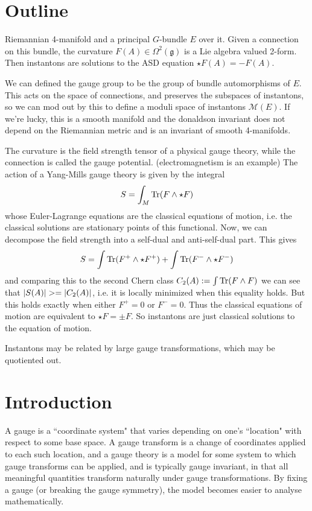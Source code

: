 \section{Outline}
Riemannian 4-manifold and a principal $G$-bundle $E$ over it. Given a connection
on this bundle, the curvature  $F(A)\in \Omega^2(\mathfrak{g})$ is a Lie algebra
valued 2-form. Then instantons are solutions to the ASD equation $\star F(A) =
-F(A)$. 

We can defined the gauge group to be the group of bundle automorphisms of  $E$.
This acts on the space of connections, and preserves the subspaces of
instantons, so we can mod out by this to define a moduli space of instantons
$\mathcal{M}(E)$. If we're lucky, this is a smooth manifold and the donaldson
invariant does not depend on the Riemannian metric and is an invariant of smooth
4-manifolds. 

The curvature is the field strength tensor of a physical gauge theory, while the
connection is called the gauge potential. (electromagnetism is an example)
The action of a Yang-Mills gauge theory is given by the integral
\[
S = \int_M \operatorname{Tr} (F\wedge \star F)
\] 
whose Euler-Lagrange equations are the classical equations of motion, i.e. the
classical solutions are stationary points of this functional. Now, we can
decompose the field strength into a self-dual and anti-self-dual part.
This gives 
\[
S = \int \operatorname{Tr}(F^{+}\wedge \star F^{+}) +\int \operatorname{Tr}(F^{-}\wedge \star F^{-})
\] 
and comparing this to the second Chern class $C_2(A) := \int \operatorname{Tr}(F\wedge F)$ we
can see that $\abs{S(A)} >= \abs{C_2(A)}$, i.e. it is locally minimized when
this equality holds. But this holds exactly when either $F^{+}=0$ or $F^{-}=0$.
Thus the classical equations of motion are equivalent to $\star F = \pm F$. So
instantons are just classical solutions to the equation of motion.

Instantons may be related by large gauge transformations, which may be
quotiented out.




\section{Introduction}
A gauge is a ``coordinate system" that varies depending on one's ``location"
with respect to some base space. A gauge transform is a change of coordinates
applied to each such location, and a gauge theory is a model for some system to
which gauge transforms can be applied, and is typically gauge invariant, in that
all meaningful quantities transform naturally under gauge transformations. By
fixing a gauge (or breaking the gauge symmetry), the model becomes easier to
analyse mathematically. 




